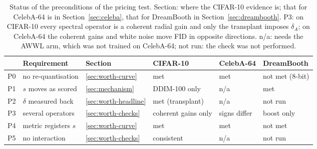 \begin{table}[tbp]
\centering
\small
\caption{Status of the preconditions of the pricing test. Section: where the
  CIFAR-10 evidence is; that for CelebA-64 is in Section~\ref{sec:celeba}, that
  for DreamBooth in Section~\ref{sec:dreambooth}. P3: on CIFAR-10 every
  spectral operator is a coherent radial gain and only the transplant imposes
  $\delta_A$; on CelebA-64 the coherent gains and white noise move FID in
  opposite directions. n/a: needs the AWWL
  arm, which was not trained on CelebA-64; not run: the check was not
  performed.}
\label{tab:preconditions}
\begin{tabular}{@{}llllll@{}}
\toprule
 & Requirement & Section & CIFAR-10 & CelebA-64 & DreamBooth \\
\midrule
P0 & no re-quantisation & \ref{sec:worth-curve} & met & met
  & not met (8-bit) \\
P1 & $s$ moves as scored & \ref{sec:mechanism} & DDIM-100 only & n/a
  & met \\
P2 & $\delta$ measured back & \ref{sec:worth-headline} & met (transplant)
  & n/a & not run \\
P3 & several operators & \ref{sec:worth-checks}
  & coherent gains only & signs differ & boost only \\
P4 & metric registers $s$ & \ref{sec:worth-curve}
  & met & met & not met \\
P5 & no interaction & \ref{sec:worth-checks} & consistent & n/a
  & not run \\
\bottomrule
\end{tabular}
\end{table}
